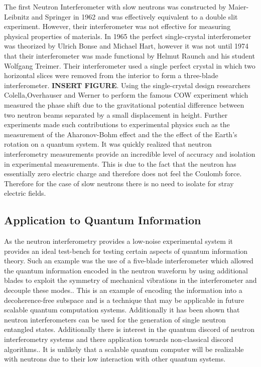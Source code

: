 The first Neutron Interferometer with slow neutrons was constructed by Maier-Leibnitz and Springer in 1962 and was effectively equivalent to a double slit experiment. However, their interferometer was not effective for measuring physical properties of materials. In 1965 the perfect single-crystal interferometer was theorized by Ulrich Bonse and Michael Hart, however it was not until 1974 that their interferometer was made functional by Helmut Raunch and his student Wolfgang Treimer. Their interferometer used a single perfect crystal in which two horizontal slices were removed from the interior to form a three-blade interferometer.\cite{neutron_history} \textbf{INSERT FIGURE}. Using the single-crystal design researchers Colella,Overhauser and Werner to perform the famous COW experiment which measured the phase shift due to the gravitational potential difference between two neutron beams separated by a small displacement in height.\cite{cow} Further experiments made such contributions to experimental physics such as the measurement of the Aharonov-Bohm effect and the the effect of the Earth's rotation on a quantum system.\cite{neutron_history} It was quickly realized that neutron interferometry measurements provide an incredible level of accuracy and isolation in experimental measurements. This is due to the fact that the neutron has essentially zero electric charge and therefore does not feel the Coulomb force. Therefore for the case of slow neutrons there is no need to isolate for stray electric fields. 
\subsection{Application to Quantum Information}
As the neutron interferometry provides a low-noise experimental system it provides an ideal test-bench for testing certain aspects of quantum information theory. Such an example was the use of a five-blade interferometer which allowed the quantum information encoded in the neutron waveform by using additional blades to exploit the symmetry of mechanical vibrations in the interferometer and decouple these modes.\cite{five_blade}. This is an example of encoding the information into a decoherence-free subspace and is a technique that may be applicable in future scalable quantum computation systems. Additionally it has been shown that neutron interferometers can be used for the generation of single neutron entangled states. \cite{neutron_entanglement}   Additionally there is interest in the quantum discord of neutron interferometry systems and there application towards non-classical discord algorithms.\cite{noise_neutron}. It is unlikely that a scalable quantum computer will be realizable with neutrons due to their low interaction with other quantum systems.  
